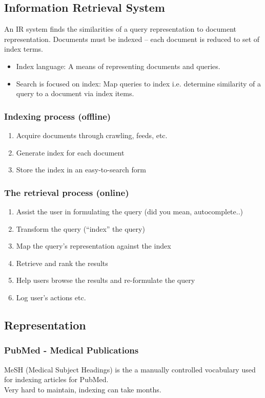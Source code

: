 \documentclass[11pt]{article}
\begin{document}
\subsection{Information Retrieval System}
An IR system finds the similarities of a query representation to
document representation. Documents must be indexed – each document is reduced to set of index terms.
\begin{itemize}
    \item Index language: A means of representing documents and queries.
    \item Search is focused on index: Map queries to index i.e. determine similarity of a query to a document via index items.
\end{itemize}
\subsubsection{Indexing process (offline)}
\begin{enumerate}
    \item Acquire documents through crawling, feeds, etc.
    \item Generate index for each document
    \item Store the index in an easy-to-search form
\end{enumerate}
\subsubsection{The retrieval process (online)}
\begin{enumerate}
    \item Assist the user in formulating the query (did you mean, autocomplete..)
    \item Transform the query (“index” the query)
    \item Map the query’s representation against the index
    \item Retrieve and rank the results
    \item Help users browse the results and re-formulate the query
    \item Log user’s actions etc.
\end{enumerate}

\subsection{Representation}
\subsubsection{PubMed - Medical Publications}
MeSH (Medical Subject Headings) is the a manually controlled
vocabulary used for indexing articles for PubMed.\\
Very hard to maintain, indexing can take months.
\end{document}

